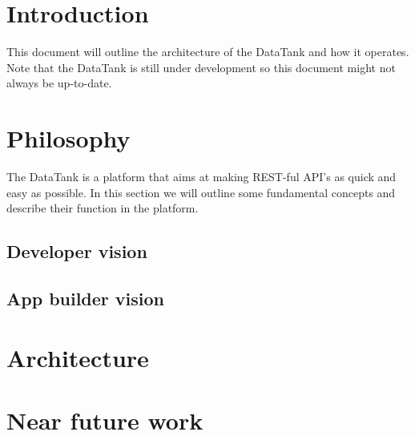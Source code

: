 \documentclass[12pt]{article}
\begin{document}
\maketitle

\section{Introduction}
This document will outline the architecture of the DataTank and how it operates. Note that the DataTank is still under development so this document might not always be up-to-date.

\section{Philosophy}
The DataTank is a platform that aims at making REST-ful API's as quick and easy as possible. In this section we will outline some fundamental concepts and describe their function in the platform.

\subsection{Developer vision}

\subsection{App builder vision }

\section{Architecture}

\section{Near future work}
\end{document}
